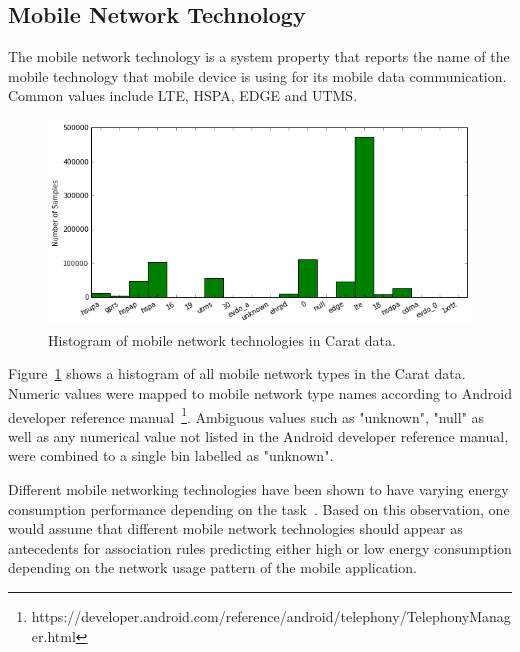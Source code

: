 \subsection{Mobile Network Technology}  

The mobile network technology is a system property that reports the name of the mobile technology that mobile device is using for its mobile data communication. Common values include LTE, HSPA, EDGE and UTMS.

\begin{figure} %
	\centering
	\includegraphics[width=\textwidth]{images/carat-data/mobile_net_type.png}
	\caption{Histogram of mobile network technologies in Carat data.}
	\label{figure:carat-data-mobile-net-type}
\end{figure}   

Figure~\ref{figure:carat-data-mobile-net-type} shows a histogram of all mobile network types in the Carat data. Numeric values were mapped to mobile network type names according to Android developer reference manual~\footnote{https://developer.android.com/reference/android/telephony/TelephonyManager.html}. Ambiguous values such as "unknown", "null" as well as any numerical value not listed in the Android developer reference manual, were combined to a single bin labelled as "unknown". 

Different mobile networking technologies have been shown to have varying energy consumption performance depending on the task~\cite{5357972}. Based on this observation, one would assume that different mobile network technologies should appear as antecedents for association rules predicting either high or low energy consumption depending on the network usage pattern of the mobile application.  


